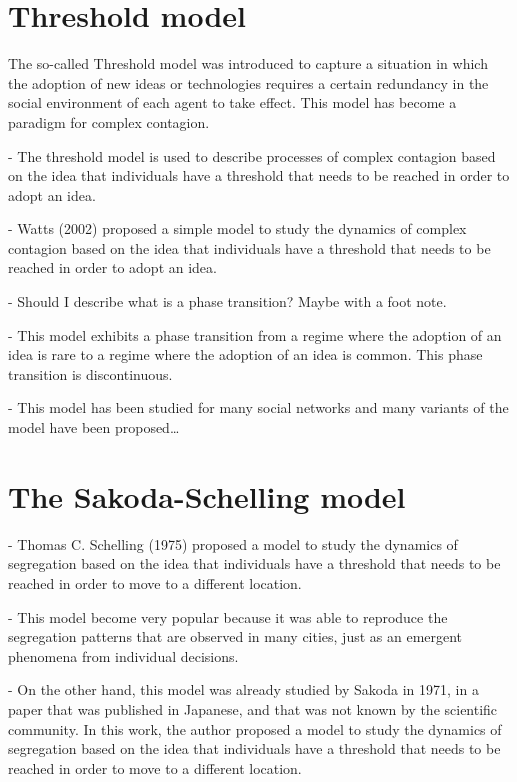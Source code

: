 \section{\label{sec:Threshold model} Threshold model}

The so-called Threshold model was introduced to capture a situation in which the adoption of new ideas or technologies requires a certain redundancy in the social environment of each agent to take effect. This model has become a paradigm for complex contagion.

- The threshold model is used to describe processes of complex contagion based on the idea that individuals have a threshold that needs to be reached in order to adopt an idea.

- Watts (2002) proposed a simple model to study the dynamics of complex contagion based on the idea that individuals have a threshold that needs to be reached in order to adopt an idea. 

- Should I describe what is a phase transition? Maybe with a foot note.

- This model exhibits a phase transition from a regime where the adoption of an idea is rare to a regime where the adoption of an idea is common. This phase transition is discontinuous.

- This model has been studied for many social networks and many variants of the model have been proposed\dots

\section{\label{sec:The Sakoda-Schelling model} The Sakoda-Schelling model}

- Thomas C. Schelling (1975) proposed a model to study the dynamics of segregation based on the idea that individuals have a threshold that needs to be reached in order to move to a different location. 

- This model become very popular because it was able to reproduce the segregation patterns that are observed in many cities, just as an emergent phenomena from individual decisions.

- On the other hand, this model was already studied by Sakoda in 1971, in a paper that was published in Japanese, and that was not known by the scientific community. In this work, the author proposed a model to study the dynamics of segregation based on the idea that individuals have a threshold that needs to be reached in order to move to a different location.

